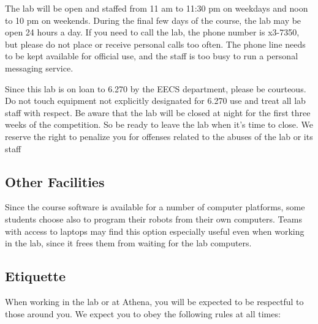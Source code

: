 The lab will be open and staffed from 11 am to 11:30 pm on weekdays and
noon to 10 pm on weekends. During the final few days of the course,
the lab may be open 24 hours a day. If you need to call the lab, the
phone number is x3-7350, but please do not place or receive personal
calls too often. The phone line needs to be kept available for
official use, and the staff is too busy to run a personal messaging
service.

Since this lab is on loan to 6.270 by the EECS department, please
be courteous. Do not touch equipment not explicitly designated for 
6.270 use and treat all lab staff with respect.
Be aware that the lab will be closed at night for the first three weeks 
of the competition. So be ready to leave the lab when it's time to close. 
We reserve the right to penalize you for offenses related to the 
abuses of the lab or its staff

\subsection{Other Facilities}

Since the course software is available for a number of computer platforms, some
students choose also to program their robots from their own computers. Teams
with access to laptops may find this option especially useful even when working
in the lab, since it frees them from waiting for the lab computers.

\subsection{Etiquette}

When working in the lab or at Athena, you will be expected to be respectful to
those around you. We expect you to obey the following rules at all times:


